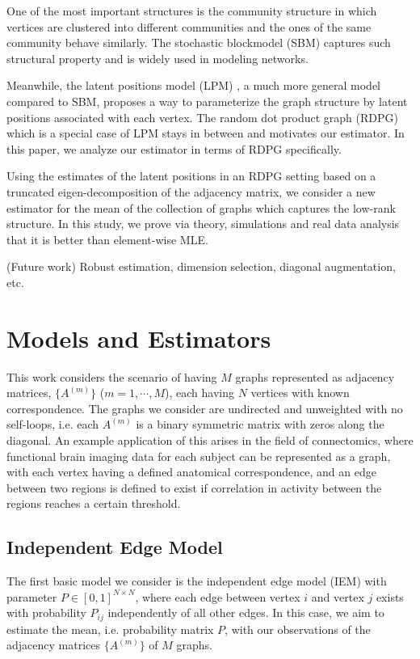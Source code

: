 \documentclass[a4paper]{article}
\begin{document}
One of the most important structures is the community structure in which vertices are clustered into different communities and the ones of the same community behave similarly. The stochastic blockmodel (SBM) \cite{holland1983stochastic} captures such structural property and is widely used in modeling networks.

Meanwhile, the latent positions model (LPM) \cite{hoff2002latent}, a much more general model compared to SBM, proposes a way to parameterize the graph structure by latent positions associated with each vertex. The random dot product graph (RDPG) \cite{young2007random, nickel2007random} which is a special case of LPM stays in between and motivates our estimator. In this paper, we analyze our estimator in terms of RDPG specifically.

Using the estimates of the latent positions in an RDPG setting based on a truncated eigen-decomposition of the adjacency matrix, we consider a new estimator for the mean of the collection of graphs which captures the low-rank structure. In this study, we prove via theory, simulations and real data analysis that it is better than element-wise MLE.

(Future work) Robust estimation, dimension selection, diagonal augmentation, etc.



\section{Models and Estimators}
This work considers the scenario of having $M$ graphs represented as adjacency matrices, $\{A^{(m)}\}$ ($m = 1, \cdots, M$), each having $N$ vertices with known correspondence. The graphs we consider are undirected and unweighted with no self-loops, i.e. each $A^{(m)}$ is a binary symmetric matrix with zeros along the diagonal. An example application of this arises in the field of connectomics, where functional brain imaging data for each subject can be represented as a graph, with each vertex having a defined anatomical correspondence, and an edge between two regions is defined to exist if correlation in activity between the regions reaches a certain threshold.



\subsection{Independent Edge Model}
The first basic model we consider is the independent edge model (IEM) with parameter $P \in [0,1]^{N\times N}$\cite{bollobas2007phase}, where each edge between vertex $i$ and vertex $j$ exists with probability $P_{ij}$ independently of all other edges. In this case, we aim to estimate the mean, i.e. probability matrix $P$, with our observations of the adjacency matrices $\{A^{(m)}\}$ of $M$ graphs.
\end{document}
